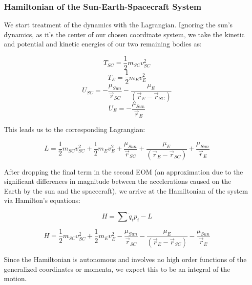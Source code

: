\documentclass[11pt,twoside,letterpaper]{article}
\begin{document}
  \subsubsection {Hamiltonian of the Sun-Earth-Spacecraft System}
  We start treatment of the dynamics with the Lagrangian. Ignoring the
  sun’s dynamics, as it’s the center of our chosen coordinate system,
  we take the kinetic and potential and kinetic energies of our two
  remaining bodies as:

  \begin {equation}
    T_{SC} = \frac{1}{2}m_{SC}v^2_{SC}
  \end {equation}
  \begin {equation}
    T_E = \frac{1}{2}m_Ev^2_E
  \end {equation}
  \begin {equation}
    U_{SC} = -\frac{\mu_{Sun}}{\vec{r}_{SC}} - \frac{\mu_E}{\left(\vec{r}_E - \vec{r}_{SC}\right)}
  \end {equation}
  \begin {equation}
    U_E = -\frac{\mu_{Sun}}{\vec{r}_{E}}
  \end {equation}

  This leads us to the corresponding Lagrangian:

  \begin {equation}
    L = \frac{1}{2}m_{SC}v^2_{SC} + \frac{1}{2}m_Ev^2_E
    + \frac{\mu_{Sun}}{\vec{r}_{SC}} + \frac{\mu_E}{\left(\vec{r}_E - \vec{r}_{SC}\right)}
     + \frac{\mu_{Sun}}{\vec{r}_{E}}
  \end {equation}
  
  After dropping the final term in the second EOM (an approximation
  due to the significant differences in magnitude between the
  accelerations caused on the Earth by the sun and the spacecraft), we
  arrive at the Hamiltonian of the system via Hamilton’s equations:

  \begin {equation}
    H = \sum{\dot{q}_ip_i} - L
  \end {equation}
  
  \begin {equation}
    H = \frac{1}{2}m_{SC}v^2_{SC} + \frac{1}{2}m_Ev^2_E
    - \frac{\mu_{Sun}}{\vec{r}_{SC}} - \frac{\mu_E}{\left(\vec{r}_E - \vec{r}_{SC}\right)}
    - \frac{\mu_{Sun}}{\vec{r}_{E}}
  \end {equation}
    
  Since the Hamiltonian is autonomous and involves no high order
  functions of the generalized coordinates or momenta, we expect this
  to be an integral of the motion.
  
\end{document}
